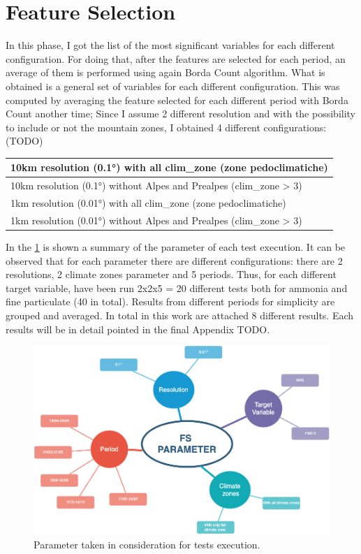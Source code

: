 \section{Feature Selection}
In this phase, I got the list of the most significant variables for each different configuration.
For doing that, after the features are selected for each period, an average of them is performed using again Borda Count algorithm. What is obtained is a general set of variables for each different configuration.
This was computed by averaging the feature selected for each different period with Borda Count another time;
Since I assume 2 different resolution and with the possibility to include or not the mountain zones, I obtained 4 different configurations: (TODO)
\begin{table}[H]
    \centering
    \begin{tabular}{|l|}
    \hline
        10km resolution (0.1°) with all clim\_zone (zone pedoclimatiche)  \\ \hline
        10km resolution (0.1°) without Alpes and Prealpes (clim\_zone > 3) \\ \hline
        1km resolution (0.01°) with all clim\_zone (zone pedoclimatiche)   \\ \hline
        1km resolution (0.01°) without Alpes and Prealpes (clim\_zone > 3)  \\ \hline
 
    \end{tabular}
\end{table}
In the \ref{fig:test_params} is shown a summary of the parameter of each test execution.
It can be observed that for each parameter there are different configurations: there are 2 resolutions, 2 climate zones parameter and 5 periods. Thus, for each different target variable, have been run 2x2x5 = 20 different tests both for ammonia and fine particulate (40 in total). 
Results from different periods for simplicity are grouped and averaged. In total in this work are attached 8 different results. Each results will be in detail pointed in the final Appendix TODO.
\begin{figure}[H]
    \centering
    \includegraphics[width=.9\textwidth]{images/test_param.png}
    \caption{Parameter taken in consideration for tests execution.}
    \label{fig:test_params}
\end{figure}


